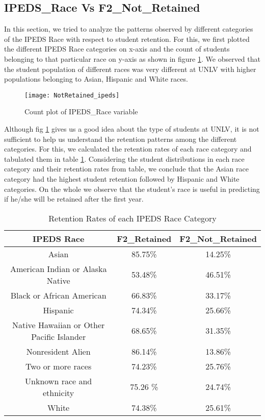 \documentclass[11pt,openright]{report}
\begin{document}
\subsection {IPEDS\_Race Vs F2\_Not\_Retained}
In this section, we tried to analyze the patterns observed by different categories of the IPEDS Race with respect to student retention. For this, we first plotted the different IPEDS Race categories on x-axis and the count of students belonging to that particular race on y-axis as shown in figure \ref{fig:ipeds_F2NotRetained_plot}. We observed that the student population of different races was very different at UNLV with higher populations belonging to Asian, Hispanic and White races.


\begin{figure}[!ht]
	\centering
	\texttt{[image: NotRetained\_ipeds]}
	\caption{Count plot of IPEDS\_Race variable}
	\label{fig:ipeds_F2NotRetained_plot}
\end{figure}

Although fig \ref{fig:ipeds_F2NotRetained_plot} gives us a good idea about the type of students at UNLV, it is not sufficient to help us understand the retention patterns among the different categories. For this, we calculated the retention rates of each race category and tabulated them in table \ref{table:ipeds_race_retentions}. Considering the student distributions in each race category and their retention rates from table, we conclude that the Asian race category had the highest student retention followed by Hispanic and White categories. On the whole we observe that the student's race is useful in predicting if he/she will be retained after the first year.

 \begin{table}[!t]
	\renewcommand{\arraystretch}{1.3}
	\caption{Retention Rates of each IPEDS Race Category}
	\label{table:ipeds_race_retentions}
	\centering
	\begin{tabular}{|c|c|c|}
		\hline
		\bfseries IPEDS Race & \bfseries F2\_Retained & \bfseries F2\_Not\_Retained\\
		\hline
		Asian & 85.75\% & 14.25\% \\ \hline
		American Indian or Alaska Native & 53.48\% & 46.51\% \\ \hline
		Black or African American & 66.83\% & 33.17\% \\ \hline
		Hispanic & 74.34\% & 25.66\% \\ \hline
		Native Hawaiian or Other Pacific Islander & 68.65\% & 31.35\% \\ \hline
		Nonresident Alien & 86.14\% & 13.86\% \\ \hline
		Two or more races &  74.23\% &  25.76\% \\ \hline
		Unknown race and ethnicity & 75.26 \% & 24.74\% \\ \hline
		White & 74.38\% & 25.61\% \\ \hline
	\end{tabular}
\end{table}
\end{document}
